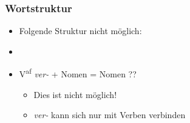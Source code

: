 \begin{frame}
\frametitle{Wortstruktur}

\begin{minipage}{.48\textwidth}

\begin{itemize}
	\item Folgende Struktur nicht möglich:
	\item[]
	\item V\textsuperscript{af} \emph{ver-} + Nomen = Nomen ??
	
	\begin{itemize}
		\item Dies ist nicht möglich!
		\item \emph{ver-} kann sich nur mit Verben verbinden
	\end{itemize}
\end{itemize}
\end{minipage}\hfill%
\begin{minipage}{.48\textwidth}
\begin{figure}
\centering
{}
\end{figure}

\end{minipage}

\end{frame}



